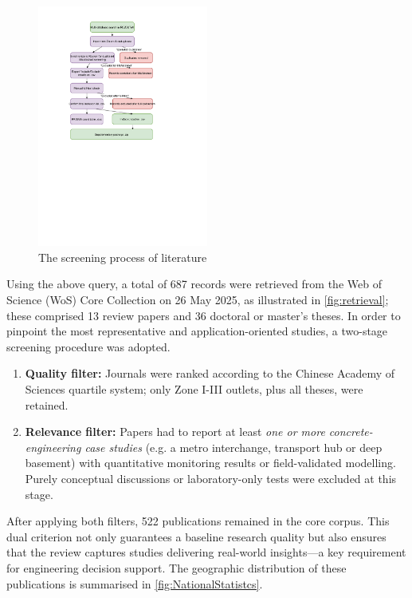 \documentclass[preprint,11pt,authoryear,3p]{elsarticle}
\begin{document}
\begin{figure}
  \centering
  \includegraphics[width=0.5\textwidth]{imgs/PRISMA.pdf}
  \caption{The screening process of literature}
  \label{fig:ScreenProcess}
\end{figure}

Using the above query, a total of 687 records were retrieved from the Web of Science (WoS) Core Collection on 26 May 2025, as illustrated in \autoref{fig:retrieval}; these comprised 13 review papers and 36 doctoral or master's theses. In order to pinpoint the most representative and application-oriented studies, a two-stage screening procedure was adopted.

\begin{enumerate}
    \item \textbf{Quality filter:} Journals were ranked according to the Chinese Academy of Sciences quartile system; only Zone I-III outlets, plus all theses, were retained.
    \item \textbf{Relevance filter:} Papers had to report at least \emph{one or more concrete-engineering case studies} (e.g. a metro interchange, transport hub or deep basement) with quantitative monitoring results or field-validated modelling. Purely conceptual discussions or laboratory-only tests were excluded at this stage.
\end{enumerate}

After applying both filters, 522 publications remained in the core corpus. This dual criterion not only guarantees a baseline research quality but also ensures that the review captures studies delivering real-world insights—a key
requirement for engineering decision support. The geographic distribution of these publications is summarised in \autoref{fig:NationalStatistcs}.
\end{document}
